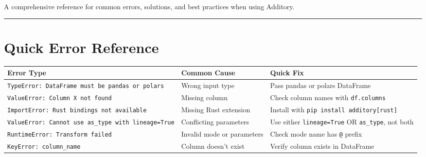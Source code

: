 \documentclass[
  letterpaper,
]{scrbook}
\begin{document}
A comprehensive reference for common errors, solutions, and best
practices when using Additory.

\begin{center}\rule{0.5\linewidth}{0.5pt}\end{center}

\section{Quick Error Reference}\label{quick-error-reference}

\begin{longtable}[]{@{}
  >{\raggedright\arraybackslash}p{}
  >{\raggedright\arraybackslash}p{}
  >{\raggedright\arraybackslash}p{}@{}}
\toprule\noalign{}
\begin{minipage}[b]{\linewidth}\raggedright
Error Type
\end{minipage} & \begin{minipage}[b]{\linewidth}\raggedright
Common Cause
\end{minipage} & \begin{minipage}[b]{\linewidth}\raggedright
Quick Fix
\end{minipage} \\
\midrule\noalign{}
\endhead
\bottomrule\noalign{}
\endlastfoot
\texttt{TypeError:\ DataFrame\ must\ be\ pandas\ or\ polars} & Wrong
input type & Pass pandas or polars DataFrame \\
\texttt{ValueError:\ Column\ \textquotesingle{}X\textquotesingle{}\ not\ found}
& Missing column & Check column names with \texttt{df.columns} \\
\texttt{ImportError:\ Rust\ bindings\ not\ available} & Missing Rust
extension & Install with \texttt{pip\ install\ additory{[}rust{]}} \\
\texttt{ValueError:\ Cannot\ use\ \textquotesingle{}as\_type\textquotesingle{}\ with\ \textquotesingle{}lineage=True\textquotesingle{}}
& Conflicting parameters & Use either \texttt{lineage=True} OR
\texttt{as\_type}, not both \\
\texttt{RuntimeError:\ Transform\ failed} & Invalid mode or parameters &
Check mode name has \texttt{@} prefix \\
\texttt{KeyError:\ \textquotesingle{}column\_name\textquotesingle{}} &
Column doesn't exist & Verify column exists in DataFrame \\
\end{longtable}
\end{document}
